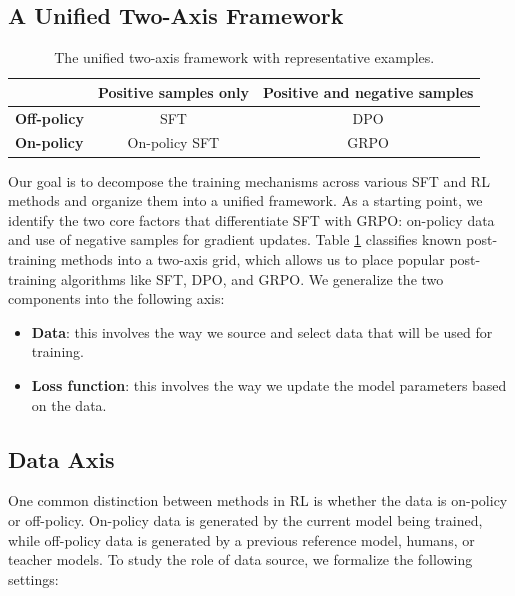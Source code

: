 \documentclass{article}
\newcommand{\el}[1]{\textcolor{purple}{EL: #1}}
\begin{document}
\subsection{A Unified Two-Axis Framework}
\label{sec:methods}

\begin{table}[t]
\centering
\caption{The unified two-axis framework with representative examples.}
\label{tab:unified-framework}

\setlength{\arrayrulewidth}{0.4pt}
\renewcommand{\arraystretch}{1.15}

\begin{tabular}{|l|c|c|}
\hline
& \textbf{Positive samples only}
& \textbf{Positive and negative samples} \\
\hline
\textbf{Off-policy} & SFT & DPO \\
\hline
\textbf{On-policy} & On-policy SFT & GRPO \\
\hline
\end{tabular}
\end{table}

Our goal is to decompose the training mechanisms across various SFT and RL methods and organize them into a unified framework. As a starting point, we identify the two core factors that differentiate SFT with GRPO: on-policy data and use of negative samples for gradient updates. Table \ref{tab:unified-framework} classifies known post-training methods into a two-axis grid, which allows us to place popular post-training algorithms like SFT, DPO, and GRPO.
We generalize the two components into the following axis:
\begin{itemize}
    \item \textbf{Data}: this involves the way we source and select data that will be used for training. 
    \item \textbf{Loss function}: this involves the way we update the model parameters based on the data.
\end{itemize}
   
\subsection{Data Axis}

One common distinction between methods in RL is whether the data is on-policy or off-policy. On-policy data is generated by the current model being trained, while off-policy data is generated by a previous reference model, humans, or teacher models. To study the role of data source, we formalize the following settings:
\end{document}
